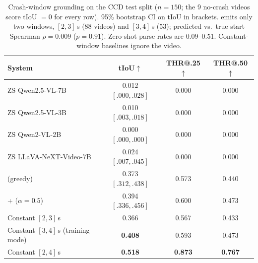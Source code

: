 \begin{table}[!t]
\centering
\caption{Crash-window grounding on the CCD test split ($n{=}150$; the 9 no-crash videos score tIoU $=0$ for every row). 95\% bootstrap CI on tIoU in brackets. \crashlogic{} emits only two windows, $[2,3]$\,s (88 videos) and $[3,4]$\,s (53); predicted vs.\ true start Spearman $\rho{=}0.009$ ($p{=}0.91$). Zero-shot parse rates are $0.09$--$0.51$. Constant-window baselines ignore the video.}
\label{tab:e3}
\small
\setlength{\tabcolsep}{8pt}
\begin{tabular*}{\textwidth}{@{\extracolsep{\fill}}lccc@{}}
\toprule
\textbf{System} & \textbf{tIoU}$\uparrow$ & \textbf{THR@.25}$\uparrow$ & \textbf{THR@.50}$\uparrow$ \\
\midrule
ZS Qwen2.5-VL-7B        & 0.012 $[.000,.028]$ & 0.000 & 0.000 \\
ZS Qwen2.5-VL-3B        & 0.010 $[.003,.018]$ & 0.000 & 0.000 \\
ZS Qwen2-VL-2B          & 0.000 $[.000,.000]$ & 0.000 & 0.000 \\
ZS LLaVA-NeXT-Video-7B  & 0.024 $[.007,.045]$ & 0.000 & 0.000 \\
\midrule
\crashlogic{} (greedy)                  & 0.373 $[.312,.438]$ & 0.573 & 0.440 \\
\crashlogic{} + \tcd{} ($\alpha{=}0.5$) & 0.394 $[.336,.456]$ & 0.600 & 0.473 \\
\midrule
Constant $[2,3]$\,s                     & 0.366 & 0.567 & 0.433 \\
Constant $[3,4]$\,s (training mode)     & \textbf{0.408} & 0.593 & 0.473 \\
Constant $[2,4]$\,s                     & \textbf{0.518} & \textbf{0.873} & \textbf{0.767} \\
\bottomrule
\end{tabular*}
\end{table}
